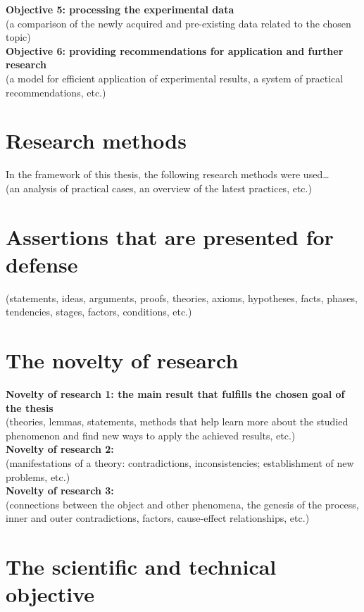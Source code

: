 \textbf{Objective 5: processing the experimental data }\\
(a comparison of the newly acquired and pre-existing data related to the chosen topic) \\

\textbf{Objective 6: providing recommendations for application and further research}\\
(a model for efficient application of experimental results, a system of practical recommendations, etc.)

\section*{Research methods}
In the framework of this thesis, the following research methods were used…\\
(an analysis of practical cases, an overview of the latest practices, etc.)

\section*{Assertions that are presented for defense}
(statements, ideas, arguments, proofs, theories, axioms, hypotheses, facts, phases, tendencies, stages, factors, conditions, etc.)

\section*{The novelty of research}
\textbf{Novelty of research 1: the main result that fulfills the chosen goal of the thesis}\\
(theories, lemmas, statements, methods that help learn more about the studied phenomenon and find new ways to apply the achieved results, etc.)\\

\textbf{Novelty of research 2:}\\
(manifestations of a theory: contradictions, inconsistencies; establishment of new problems, etc.) \\

\textbf{Novelty of research 3:}\\
(connections between the object and other phenomena, the genesis of the process, inner and outer contradictions, factors, cause-effect relationships, etc.)

\section*{The scientific and technical objective}
